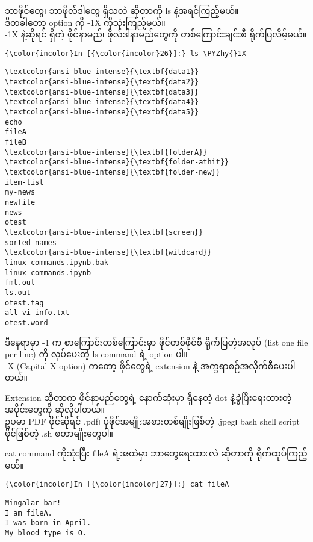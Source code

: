 \documentclass[11pt]{article}
\def\PYZhy{\char`\-}
\begin{document}
    ဘာဖိုင်တွေ၊ ဘာဖိုလ်ဒါတွေ ရှိသလဲ ဆိုတာကို ls နဲ့အရင်ကြည့်မယ်။\\
ဒီတခါတော့ option ကို -1X ကိုသုံးကြည့်မယ်။\\
-1X နဲ့ဆိုရင် ရှိတဲ့ ဖိုင်နာမည်၊ ဖိုလ်ဒါနာမည်တွေကို တစ်ကြောင်းချင်းစီ
ရိုက်ပြလိမ့်မယ်။

    \begin{Verbatim}[commandchars=\\\{\}]
{\color{incolor}In [{\color{incolor}26}]:} ls \PYZhy{}1X
\end{Verbatim}

    \begin{Verbatim}[commandchars=\\\{\}]
\textcolor{ansi-blue-intense}{\textbf{data1}}
\textcolor{ansi-blue-intense}{\textbf{data2}}
\textcolor{ansi-blue-intense}{\textbf{data3}}
\textcolor{ansi-blue-intense}{\textbf{data4}}
\textcolor{ansi-blue-intense}{\textbf{data5}}
echo
fileA
fileB
\textcolor{ansi-blue-intense}{\textbf{folderA}}
\textcolor{ansi-blue-intense}{\textbf{folder-athit}}
\textcolor{ansi-blue-intense}{\textbf{folder-new}}
item-list
my-news
newfile
news
otest
\textcolor{ansi-blue-intense}{\textbf{screen}}
sorted-names
\textcolor{ansi-blue-intense}{\textbf{wildcard}}
linux-commands.ipynb.bak
linux-commands.ipynb
fmt.out
ls.out
otest.tag
all-vi-info.txt
otest.word

    \end{Verbatim}

    ဒီနေရာမှာ -1 က စာကြောင်းတစ်ကြောင်းမှာ ဖိုင်တစ်ဖိုင်စီ ရိုက်ပြတဲ့အလုပ်
(list one file per line) ကို လုပ်ပေးတဲ့ ls command ရဲ့ option ပါ။\\
-X (Capital X option) ကတော့ ဖိုင်တွေရဲ့ extension နဲ့
အက္ခရာစဉ်အလိုက်စီပေးပါတယ်။

Extension ဆိုတာက ဖိုင်နာမည်တွေရဲ့ နောက်ဆုံးမှာ ရှိနေတဲ့ dot
နဲ့ခွဲပြီးရေးထားတဲ့ အပိုင်းတွေကို ဆိုလိုပါတယ်။\\
ဥပမာ PDF ဖိုင်ဆိုရင် .pdf၊ ပုံဖိုင်အမျိုးအစားတစ်မျိုးဖြစ်တဲ့ .jpeg၊ bash
shell script ဖိုင်ဖြစ်တဲ့ .sh စတာမျိုးတွေပါ။

    cat command ကိုသုံးပြီး fileA ရဲ့အထဲမှာ ဘာတွေရေးထားလဲ ဆိုတာကို
ရိုက်ထုပ်ကြည့်မယ်။

    \begin{Verbatim}[commandchars=\\\{\}]
{\color{incolor}In [{\color{incolor}27}]:} cat fileA
\end{Verbatim}

    \begin{Verbatim}[commandchars=\\\{\}]
Mingalar bar!
I am fileA.
I was born in April.
My blood type is O.

    \end{Verbatim}
\end{document}
